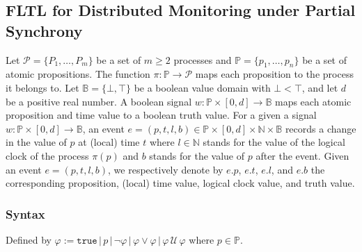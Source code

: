 \documentclass[envcountsame, runningheads]{llncs}
\newcommand{\N}{\mathbb{N}}
\newcommand{\B}{\mathbb{B}}
\def\until{\,\mathcal{U}\,}
\newcommand{\?}{\text{?}}
\begin{document}
	\subsection*{FLTL for Distributed Monitoring under Partial Synchrony}
	Let $\mathcal{P} = \{P_1, \ldots, P_m\}$ be a set of $m \geq 2$ processes and $\mathbb{P} = \{p_1, \ldots, p_n\}$ be a set of atomic propositions.
	The function $\pi : \mathbb{P} \to \mathcal{P}$ maps each proposition to the process it belongs to.
	Let $\B = \{\bot, \top\}$ be a boolean value domain with $\bot < \top$, and let $d$ be a positive real number.
	A boolean signal $w : \mathbb{P} \times [0,d] \to \B$ maps each atomic proposition and time value to a boolean truth value.
	For a given a signal $w : \mathbb{P} \times [0,d] \to \B$, an event $e = (p, t, l, b) \in \mathbb{P} \times [0,d] \times \N \times \B$ records a change in the value of $p$ at (local) time $t$ where $l \in \N$ stands for the value of the logical clock of the process $\pi(p)$ and $b$ stands for the value of $p$ after the event.
	Given an event $e = (p, t, l, b)$, we respectively denote by $e.p$, $e.t$, $e.l$, and $e.b$ the corresponding proposition, (local) time value, logical clock value, and truth value.

	
	
	\subsubsection*{Syntax}
	Defined by
	$ \varphi := \texttt{true} \,|\, p \,|\, \lnot \varphi \,|\, \varphi \lor \varphi \,|\, \varphi \until \varphi $
	where $p \in \mathbb{P}$.
	
\end{document}
